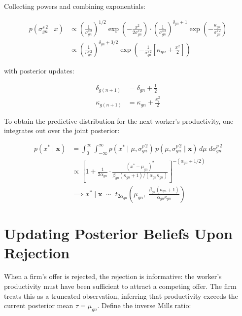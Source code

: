 \documentclass[]{article}
\begin{document}
\noindent Collecting powers and combining exponentials:

\begin{align*}
	p\!\left(\sigma^{s\,2}_{gn} \mid x\right) 
	&\propto \left(\frac{1}{\sigma^{s\,2}_{gn}}\right)^{1/2}
	\exp\!\left(-\frac{x^2}{2\sigma^{s\,2}_{gn}}\right)
	\cdot
	\left(\frac{1}{\sigma^{s\,2}_{gn}}\right)^{\delta_{gn}+1}
	\exp\!\left(-\frac{\kappa_{gn}}{\sigma^{s\,2}_{gn}}\right) \\[6pt]
	&\propto \left(\frac{1}{\sigma^{s\,2}_{gn}}\right)^{\delta_{gn}+3/2}
	\exp\!\left(-\frac{1}{\sigma^{s\,2}_{gn}}
	\left[\kappa_{gn} + \frac{x^2}{2}\right]\right)
\end{align*}

\noindent with posterior updates:

\begin{align*}
	\delta_{g(n+1)} &= \delta_{gn} + \frac{1}{2} \\[6pt]
	\kappa_{g(n+1)} &= \kappa_{gn} + \frac{x_i^2}{2}
\end{align*}

\noindent To obtain the predictive distribution for the next worker's productivity, 
one integrates out over the joint posterior:

\begin{align*}
	p(x^* \mid \mathbf{x}) 
	&= \int_0^\infty \int_{-\infty}^\infty 
	p(x^* \mid \mu, \sigma^{p\,2}_{gn})\,
	p(\mu, \sigma^{p\,2}_{gn} \mid \mathbf{x})\,
	d\mu\; d\sigma^{p\,2}_{gn} \\[6pt]
	&\propto \left[1 + \frac{1}{2\alpha_{gn}} \cdot
	\frac{(x^* - \mu_{gn})^2}{\beta_{gn}(\kappa_{gn}+1)/(\alpha_{gn}\kappa_{gn})}
	\right]^{-(\alpha_{gn}+1/2)} \\[6pt]
	&\implies x^* \mid \mathbf{x} \;\sim\; 
	t_{2\alpha_{gn}}\!\left(\mu_{gn},\;
	\frac{\beta_{gn}(\kappa_{gn}+1)}{\alpha_{gn}\kappa_{gn}}\right)
\end{align*}
\newpage
\section{Updating Posterior Beliefs Upon Rejection}
\label{ap:dataaug}

\noindent When a firm's offer is rejected, the rejection is informative: the worker's 
productivity must have been sufficient to attract a competing offer. The firm treats 
this as a truncated observation, inferring that productivity exceeds the current 
posterior mean $\tau = \mu_{gn}$. Define the inverse Mills ratio:
\end{document}
